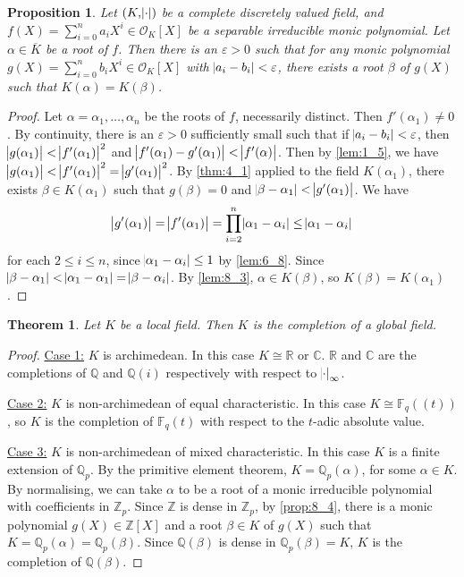 \documentclass[11pt]{article}
\theoremstyle{definition}
\theoremstyle{plain}
\newtheorem{theorem}[definition]{Theorem}
\newtheorem{proposition}[definition]{Proposition}
\theoremstyle{remark}
\newcommand{\bF}{\mathbb{F}}
\newcommand{\bZ}{\mathbb{Z}}
\newcommand{\bQ}{\mathbb{Q}}
\newcommand{\bR}{\mathbb{R}}
\newcommand{\bC}{\mathbb{C}}
\newcommand{\cO}{\mathcal{O}}
\begin{document}
\begin{proposition}\label{prop:8_4}
    Let $(K, \abs{\cdot})$ be a complete discretely valued field, and $f(X) = \sum_{i=0}^n a_i X^i \in \cO_K[X]$ be a separable irreducible monic polynomial. Let $\alpha \in \overline{K}$ be a root of $f$. Then there is an $\varepsilon > 0$ such that for any monic polynomial $g(X) = \sum_{i=0}^n b_i X^i \in \cO_K[X]$ with $\abs{a_i - b_i} < \varepsilon$, there exists a root $\beta$ of $g(X)$ such that $K(\alpha) = K(\beta)$.
\end{proposition}
\begin{proof}
    Let $\alpha = \alpha_1, \ldots, \alpha_n$ be the roots of $f$, necessarily distinct. Then $f'(\alpha_1) \neq 0$. By continuity, there is an $\varepsilon > 0$ sufficiently small such that if $\abs{a_i - b_i} < \varepsilon$, then $\abs{g(\alpha_1)} < \abs{f'(\alpha_1)}^2$ and $\abs{f'(\alpha_1) - g'(\alpha_1)} < \abs{f'(\alpha)}$. Then by \autoref{lem:1_5}, we have $\abs{g(\alpha_1)} < \abs{f'(\alpha_1)}^2 = \abs{g'(\alpha_1)}^2$. By \autoref{thm:4_1} applied to the field $K(\alpha_1)$, there exists $\beta \in K(\alpha_1)$ such that $g(\beta) = 0$ and $\abs{\beta - \alpha_1} < \abs{g'(\alpha_1)}$. We have
    \begin{equation*}
        \abs{g'(\alpha_1)} = \abs{f'(\alpha_1)} = \prod_{i=2}^n \abs{\alpha_1 - \alpha_i} \le \abs{\alpha_1 - \alpha_i}
    \end{equation*}
    for each $2 \le i \le n$, since $\abs{\alpha_1 - \alpha_i} \le 1$ by \autoref{lem:6_8}. Since $\abs{\beta - \alpha_1} < \abs{\alpha_1 - \alpha_1} = \abs{\beta - \alpha_i}$. By \autoref{lem:8_3}, $\alpha \in K(\beta)$, so $K(\beta) = K(\alpha_1)$.
\end{proof}

\begin{theorem}\label{thm:8_5}
    Let $K$ be a local field. Then $K$ is the completion of a global field.
\end{theorem}
\begin{proof}
    \underline{Case 1:} $K$ is archimedean. In this case $K \cong \bR$ or $\bC$. $\bR$ and $\bC$ are the completions of $\bQ$ and $\bQ(i)$ respectively with respect to $\abs{\cdot}_\infty$.

    \underline{Case 2:} $K$ is non-archimedean of equal characteristic. In this case $K \cong \bF_q((t))$, so $K$ is the completion of $\bF_q(t)$ with respect to the $t$-adic absolute value.

    \underline{Case 3:} $K$ is non-archimedean of mixed characteristic. In this case $K$ is a finite extension of $\bQ_p$. By the primitive element theorem, $K = \bQ_p(\alpha)$, for some $\alpha \in K$. By normalising, we can take $\alpha$ to be a root of a monic irreducible polynomial with coefficients in $\bZ_p$. Since $\bZ$ is dense in $\bZ_p$, by \autoref{prop:8_4}, there is a monic polynomial $g(X) \in \bZ[X]$ and a root $\beta \in K$ of $g(X)$ such that $K = \bQ_p(\alpha) = \bQ_p(\beta)$. Since $\bQ(\beta)$ is dense in $\bQ_p(\beta) = K$, $K$ is the completion of $\bQ(\beta)$.
\end{proof}
\end{document}
